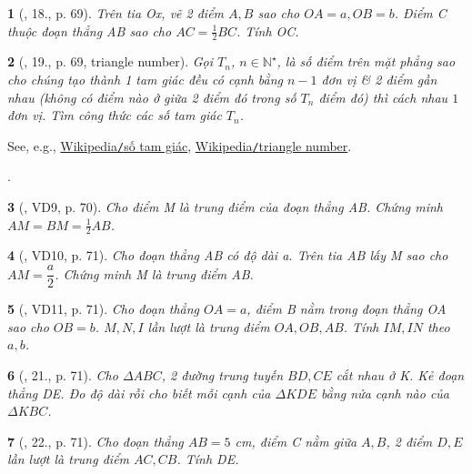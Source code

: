 \documentclass{article}
\newtheorem{baitoan}{}
\begin{document}
\begin{baitoan}[\cite{Binh_Toan_6_tap_2}, 18., p. 69]
	Trên tia Ox, vẽ 2 điểm $A,B$ sao cho $OA = a,OB = b$. Điểm C thuộc đoạn thẳng AB sao cho $AC = \frac{1}{2}BC$. Tính  OC.
\end{baitoan}

\begin{baitoan}[\cite{Binh_Toan_6_tap_2}, 19., p. 69, triangle number]
	Gọi $T_n$, $n\in\mathbb{N}^\star$, là số điểm trên mặt phẳng sao cho chúng tạo thành 1 tam giác đều có cạnh bằng $n - 1$ đơn vị \& 2 điểm gần nhau (không có điểm nào ở giữa 2 điểm đó trong số $T_n$ điểm đó) thì cách nhau $1$ đơn vị. Tìm công thức các số tam giác $T_n$.
\end{baitoan}
See, e.g., \href{https://vi.wikipedia.org/wiki/S%E1%BB%91_tam_gi%C3%A1c}{Wikipedia{\tt/}số tam giác}, \href{https://en.wikipedia.org/wiki/Triangular_number}{Wikipedia{\tt/}triangle number}.

\cite[20., p. 70]{Binh_Toan_6_tap_2}.

\begin{baitoan}[\cite{Binh_Toan_6_tap_2}, VD9, p. 70]
	Cho điểm M là trung điểm của đoạn thẳng AB. Chứng minh $AM = BM = \frac{1}{2}AB$.
\end{baitoan}

\begin{baitoan}[\cite{Binh_Toan_6_tap_2}, VD10, p. 71]
	Cho đoạn thẳng AB có độ dài a. Trên tia AB lấy M sao cho $AM = \dfrac{a}{2}$. Chứng minh M là trung điểm AB.
\end{baitoan}

\begin{baitoan}[\cite{Binh_Toan_6_tap_2}, VD11, p. 71]
	Cho đoạn thẳng $OA = a$, điểm B nằm trong đoạn thẳng OA sao cho $OB = b$. $M,N,I$ lần lượt là trung điểm $OA,OB,AB$. Tính  $IM,IN$ theo $a,b$.
\end{baitoan}

\begin{baitoan}[\cite{Binh_Toan_6_tap_2}, 21., p. 71]
	Cho $\Delta ABC$, 2 đường trung tuyến $BD,CE$ cắt nhau ở K. Kẻ đoạn thẳng DE. Đo độ dài rồi cho biết mỗi cạnh của $\Delta KDE$ bằng nửa cạnh nào của $\Delta KBC$.
\end{baitoan}

\begin{baitoan}[\cite{Binh_Toan_6_tap_2}, 22., p. 71]
	Cho đoạn thẳng $AB = 5$ {\rm cm}, điểm C nằm giữa $A,B$, 2 điểm $D,E$ lần lượt là trung điểm $AC,CB$. Tính  DE.
\end{baitoan}
\end{document}
